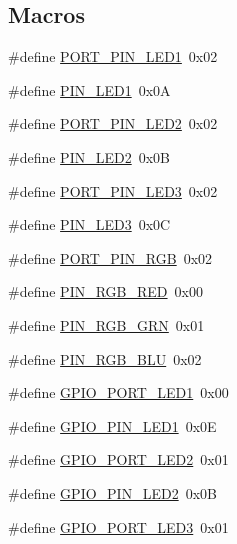 \subsection*{Macros}
\begin{DoxyCompactItemize}
\item 
\#define \hyperlink{group__hardware_ga281151e2a661c8ad6893aee42b0024c4}{P\+O\+R\+T\+\_\+\+P\+I\+N\+\_\+\+L\+E\+D1}~0x02
\item 
\#define \hyperlink{group__hardware_ga1ee291f6ef730418abd5997176fe6b4c}{P\+I\+N\+\_\+\+L\+E\+D1}~0x0A
\item 
\#define \hyperlink{group__hardware_ga3039da47774de5edf9a11968103d87c5}{P\+O\+R\+T\+\_\+\+P\+I\+N\+\_\+\+L\+E\+D2}~0x02
\item 
\#define \hyperlink{group__hardware_gaa10e44027a1a9f0ac7cba19e815205a8}{P\+I\+N\+\_\+\+L\+E\+D2}~0x0B
\item 
\#define \hyperlink{group__hardware_ga097e347296860c96d104ef8ab90dac33}{P\+O\+R\+T\+\_\+\+P\+I\+N\+\_\+\+L\+E\+D3}~0x02
\item 
\#define \hyperlink{group__hardware_ga95a9a1b175a118c828537db81141eb3d}{P\+I\+N\+\_\+\+L\+E\+D3}~0x0C
\item 
\#define \hyperlink{group__hardware_ga372c868d523a46916b874b4e3c5722f5}{P\+O\+R\+T\+\_\+\+P\+I\+N\+\_\+\+R\+GB}~0x02
\item 
\#define \hyperlink{group__hardware_gaf3069b94e5b50d3558f6c36dd2e7ab15}{P\+I\+N\+\_\+\+R\+G\+B\+\_\+\+R\+ED}~0x00
\item 
\#define \hyperlink{group__hardware_ga298bb5d50ab2ba7b00df1c59087de286}{P\+I\+N\+\_\+\+R\+G\+B\+\_\+\+G\+RN}~0x01
\item 
\#define \hyperlink{group__hardware_gadf8d2d730566aede36c12ccfbc03b1b7}{P\+I\+N\+\_\+\+R\+G\+B\+\_\+\+B\+LU}~0x02
\item 
\#define \hyperlink{group__hardware_ga04c3e41fb79d2904c2358a42414bbf7f}{G\+P\+I\+O\+\_\+\+P\+O\+R\+T\+\_\+\+L\+E\+D1}~0x00
\item 
\#define \hyperlink{group__hardware_gaa4637d2cb87305ea71351291117a95f6}{G\+P\+I\+O\+\_\+\+P\+I\+N\+\_\+\+L\+E\+D1}~0x0E
\item 
\#define \hyperlink{group__hardware_gab971c6f67d136a9b870fac0f500685d4}{G\+P\+I\+O\+\_\+\+P\+O\+R\+T\+\_\+\+L\+E\+D2}~0x01
\item 
\#define \hyperlink{group__hardware_ga5ada73f73636a4fbf726468eb63eb945}{G\+P\+I\+O\+\_\+\+P\+I\+N\+\_\+\+L\+E\+D2}~0x0B
\item 
\#define \hyperlink{group__hardware_ga8b63f7f606f2b1ec7d88205ee6c514ea}{G\+P\+I\+O\+\_\+\+P\+O\+R\+T\+\_\+\+L\+E\+D3}~0x01

\end{DoxyCompactItemize}
